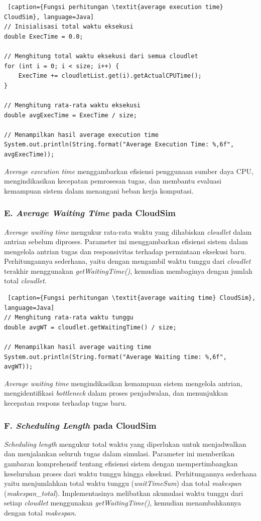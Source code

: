 \begin{lstlisting} [caption={Fungsi perhitungan \textit{average execution time} CloudSim}, language=Java]
// Inisialisasi total waktu eksekusi
double ExecTime = 0.0;

// Menghitung total waktu eksekusi dari semua cloudlet
for (int i = 0; i < size; i++) {
    ExecTime += cloudletList.get(i).getActualCPUTime();
}

// Menghitung rata-rata waktu eksekusi
double avgExecTime = ExecTime / size;

// Menampilkan hasil average execution time
System.out.println(String.format("Average Execution Time: %,6f", avgExecTime));
\end{lstlisting}

\textit{Average execution time} menggambarkan efisiensi penggunaan sumber daya CPU, mengindikasikan kecepatan pemrosesan tugas, dan membantu evaluasi kemampuan sistem dalam menangani beban kerja komputasi.

\subsubsection{E. \textit{Average Waiting Time} pada CloudSim}
\textit{Average waiting time} mengukur rata-rata waktu yang dihabiskan \textit{cloudlet} dalam antrian sebelum diproses. Parameter ini menggambarkan efisiensi sistem dalam mengelola antrian tugas dan responsivitas terhadap permintaan eksekusi baru. Perhitungannya sederhana, yaitu dengan mengambil waktu tunggu dari \textit{cloudlet} terakhir menggunakan \textit{getWaitingTime()}, kemudian membaginya dengan jumlah total \textit{cloudlet}. 

\begin{lstlisting} [caption={Fungsi perhitungan \textit{average waiting time} CloudSim}, language=Java]
// Menghitung rata-rata waktu tunggu
double avgWT = cloudlet.getWaitingTime() / size;

// Menampilkan hasil average waiting time
System.out.println(String.format("Average Waiting time: %,6f", avgWT));
\end{lstlisting}

\textit{Average waiting time} mengindikasikan kemampuan sistem mengelola antrian, mengidentifikasi \textit{bottleneck} dalam proses penjadwalan, dan menunjukkan kecepatan respons terhadap tugas baru.

\subsubsection{F. \textit{Scheduling Length} pada CloudSim}
\textit{Scheduling length} mengukur total waktu yang diperlukan untuk menjadwalkan dan menjalankan seluruh tugas dalam simulasi. Parameter ini memberikan gambaran komprehensif tentang efisiensi sistem dengan mempertimbangkan keseluruhan proses dari waktu tunggu hingga eksekusi. Perhitungannya sederhana yaitu menjumlahkan total waktu tunggu (\textit{waitTimeSum}) dan total \textit{makespan} (\textit{makespan\_total}). Implementasinya melibatkan akumulasi waktu tunggu dari setiap \textit{cloudlet} menggunakan \textit{getWaitingTime()}, kemudian menambahkannya dengan total \textit{makespan}. 

